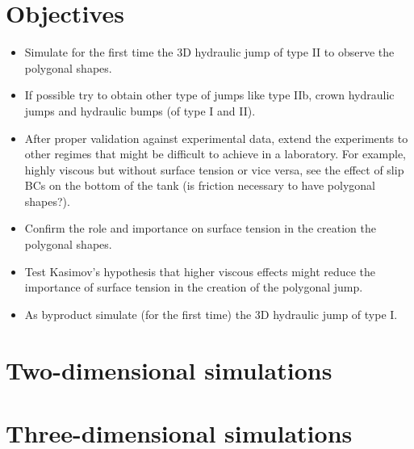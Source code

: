 \documentclass[english,11pt]{article}
\numberwithin{remark}{subsection}
\begin{document}
\section{Objectives}
\begin{itemize}
\item Simulate for the first time the 3D hydraulic jump of type II to observe the polygonal shapes.
\item If possible try to obtain other type of jumps like type IIb, crown hydraulic jumps and hydraulic bumps (of type I and II). 
\item After proper validation against experimental data, extend the experiments to other regimes that might be difficult
  to achieve in a laboratory. For example, highly viscous but without surface tension or vice versa,
  see the effect of slip BCs on the bottom of the tank (is friction necessary to have polygonal shapes?).
\item Confirm the role and importance on surface tension in the creation the polygonal shapes.
\item Test Kasimov's hypothesis that higher viscous effects might reduce the importance of surface tension in the
  creation of the polygonal jump.
\item As byproduct simulate (for the first time) the 3D hydraulic jump of type I.
\end{itemize}

\section{Two-dimensional simulations}

\section{Three-dimensional simulations}

%

%

\end{document}
